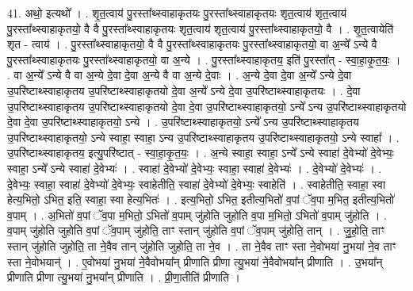 \documentclass[17pt]{extarticle}
\begin{document}
41. अथो॒ इत्यथो᳚ । . शृ॒त॒त्वाय॑ पु॒रस्ता᳚थ्स्वाहाकृतयः पु॒रस्ता᳚थ्स्वाहाकृतयः शृत॒त्वाय॑ शृत॒त्वाय॑ पु॒रस्ता᳚थ्स्वाहाकृतयो॒ वै वै पु॒रस्ता᳚थ्स्वाहाकृतयः शृत॒त्वाय॑ शृत॒त्वाय॑ पु॒रस्ता᳚थ्स्वाहाकृतयो॒ वै । . शृ॒त॒त्वायेति॑ शृत - त्वाय॑ । . पु॒रस्ता᳚थ्स्वाहाकृतयो॒ वै वै पु॒रस्ता᳚थ्स्वाहाकृतयः पु॒रस्ता᳚थ्स्वाहाकृतयो॒ वा अ॒न्ये᳚ ऽन्ये वै पु॒रस्ता᳚थ्स्वाहाकृतयः पु॒रस्ता᳚थ्स्वाहाकृतयो॒ वा अ॒न्ये । . पु॒रस्ता᳚थ्स्वाहाकृतय॒ इति॑ पु॒रस्ता᳚त् - स्वा॒हा॒कृ॒त॒यः॒ । . वा अ॒न्ये᳚ ऽन्ये वै वा अ॒न्ये दे॒वा दे॒वा अ॒न्ये वै वा अ॒न्ये दे॒वाः । . अ॒न्ये दे॒वा दे॒वा अ॒न्ये᳚ ऽन्ये दे॒वा उ॒परि॑ष्टाथ्स्वाहाकृतय उ॒परि॑ष्टाथ्स्वाहाकृतयो दे॒वा अ॒न्ये᳚ ऽन्ये दे॒वा उ॒परि॑ष्टाथ्स्वाहाकृतयः । . दे॒वा उ॒परि॑ष्टाथ्स्वाहाकृतय उ॒परि॑ष्टाथ्स्वाहाकृतयो दे॒वा दे॒वा उ॒परि॑ष्टाथ्स्वाहाकृतयो॒ ऽन्ये᳚ ऽन्य उ॒परि॑ष्टाथ्स्वाहाकृतयो दे॒वा दे॒वा उ॒परि॑ष्टाथ्स्वाहाकृतयो॒ ऽन्ये । . उ॒परि॑ष्टाथ्स्वाहाकृतयो॒ ऽन्ये᳚ ऽन्य उ॒परि॑ष्टाथ्स्वाहाकृतय उ॒परि॑ष्टाथ्स्वाहाकृतयो॒ ऽन्ये स्वाहा॒ स्वाहा॒ ऽन्य उ॒परि॑ष्टाथ्स्वाहाकृतय उ॒परि॑ष्टाथ्स्वाहाकृतयो॒ ऽन्ये स्वाहा᳚ । . उ॒परि॑ष्टाथ्स्वाहाकृतय॒ इत्यु॒परि॑ष्टात् - स्वा॒हा॒कृ॒त॒यः॒ । . अ॒न्ये स्वाहा॒ स्वाहा॒ ऽन्ये᳚ ऽन्ये स्वाहा॑ दे॒वेभ्यो॑ दे॒वेभ्यः॒ स्वाहा॒ ऽन्ये᳚ ऽन्ये स्वाहा॑ दे॒वेभ्यः॑ । . स्वाहा॑ दे॒वेभ्यो॑ दे॒वेभ्यः॒ स्वाहा॒ स्वाहा॑ दे॒वेभ्यः॑ । . दे॒वेभ्यो॑ दे॒वेभ्यः॑ । . दे॒वेभ्यः॒ स्वाहा॒ स्वाहा॑ दे॒वेभ्यो॑ दे॒वेभ्यः॒ स्वाहेतीति॒ स्वाहा॑ दे॒वेभ्यो॑ दे॒वेभ्यः॒ स्वाहेति॑ । . स्वाहेतीति॒ स्वाहा॒ स्वा हेत्य॒भितो॒ ऽभित॒ इति॒ स्वाहा॒ स्वा हेत्य॒भितः॑ । . इत्य॒भितो॒ ऽभित॒ इतीत्य॒भितो॑ व॒पां ॅव॒पा म॒भित॒ इतीत्य॒भितो॑ व॒पाम् । . अ॒भितो॑ व॒पां ॅव॒पा म॒भितो॒ ऽभितो॑ व॒पाम् जु॑होति जुहोति व॒पा म॒भितो॒ ऽभितो॑ व॒पाम् जु॑होति । . व॒पाम् जु॑होति जुहोति व॒पां ॅव॒पाम् जु॑होति॒ ताꣳ स्तान् जु॑होति व॒पां ॅव॒पाम् जु॑होति॒ तान् । . जु॒हो॒ति॒ ताꣳ स्तान् जु॑होति जुहोति॒ ता ने॒वैव तान् जु॑होति जुहोति॒ ता ने॒व । . ता ने॒वैव ताꣳ स्ता ने॒वोभया॑ नु॒भया॑ ने॒व ताꣳ स्ता ने॒वोभयान्॑ । . ए॒वोभया॑ नु॒भया॑ ने॒वैवोभया᳚न् प्रीणाति प्रीणा त्यु॒भया॑ ने॒वैवोभया᳚न् प्रीणाति । . उ॒भया᳚न् प्रीणाति प्रीणा त्यु॒भया॑ नु॒भया᳚न् प्रीणाति । . प्री॒णा॒तीति॑ प्रीणाति । \newline
\pagebreak
{}
\end{document}
